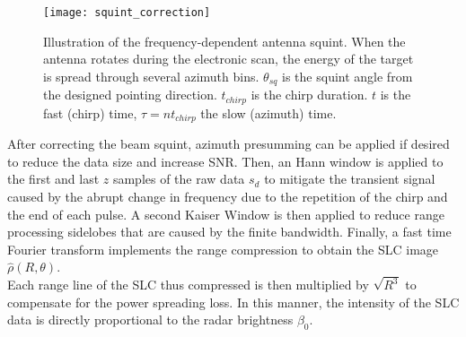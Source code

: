 \begin{figure*}[ht]
	\centering
	\texttt{[image: squint\_correction]}
	\caption{Illustration of the frequency-dependent antenna squint. When the antenna rotates during the electronic scan, the energy of the target is spread through several azimuth bins. $\theta_{sq}$ is the squint angle from the designed pointing direction. $t_{chirp}$ is the chirp duration. $t$ is the fast (chirp) time, $\tau = n t_{chirp}$ the slow (azimuth) time. }
	\label{fig:squint_correction}
\end{figure*}
After correcting the beam squint, azimuth presumming can be applied if desired to reduce the data size and increase SNR. Then, an Hann window is applied to the first and last $z$ samples of the raw data $s_{d}$ to mitigate the transient signal caused by the abrupt change in frequency due to the repetition of the chirp and the end of each pulse. A second Kaiser Window is then applied to reduce range processing sidelobes that are caused by the finite bandwidth. Finally, a fast time Fourier transform implements the range compression to obtain the SLC image $\hat{\rho}\left(R, \theta\right)$.\\ Each range line of the SLC thus compressed is then multiplied by $\sqrt{R^3}$ to compensate for the power spreading loss. In this manner, the intensity of the SLC data is directly proportional to the radar brightness $\beta_{0}$\cite{Raney1994}. 
